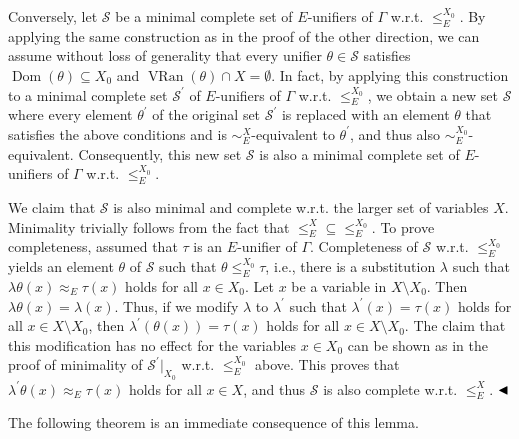 Conversely, let $\mathcal{S}$ be a minimal complete set of $E$-unifiers of $\Gamma$ w.r.t. $\leq_{E}^{X_{0}}$. By applying the same construction as in the proof of the other direction, we can assume without loss of generality that every unifier $\theta\in\mathcal{S}$ satisfies $\operatorname{Dom}(\theta)\subseteq X_{0}$ and $\operatorname{VRan}(\theta)\cap X=\emptyset$. In fact, by applying this construction to a minimal complete set $\mathcal{S}^{\prime}$ of $E$-unifiers of $\Gamma$ w.r.t. $\leq_{E}^{X_{0}}$, we obtain a new set $\mathcal{S}$ where every element $\theta^{\prime}$ of the original set $\mathcal{S}^{\prime}$ is replaced with an element $\theta$ that satisfies the above conditions and is $\sim_{E}^{X}$-equivalent to $\theta^{\prime}$, and thus also $\sim_{E}^{X_{0}}$-equivalent. Consequently, this new set $\mathcal{S}$ is also a minimal complete set of $E$-unifiers of $\Gamma$ w.r.t. $\leq_{E}^{X_{0}}$.\par
 
 
 
We claim that $\mathcal{S}$ is also minimal and complete w.r.t. the larger set of variables $X$. Minimality trivially follows from the fact that ${\leq_{E}^{X}}\subseteq{\leq_{E}^{X_{0}}}$. To prove completeness, assumed that $\tau$ is an $E$-unifier of $\Gamma$. Completeness of $\mathcal{S}$ w.r.t. $\leq_{E}^{X_{0}}$ yields an element $\theta$ of $\mathcal{S}$ such that $\theta\leq_{E}^{X_{0}}\tau$, i.e., there is a substitution $\lambda$ such that $\lambda\theta(x)\approx_{E}\tau(x)$ holds for all $x\in X_{0}$. Let $x$ be a variable in $X\setminus X_{0}$. Then $\lambda\theta(x)=\lambda(x)$. Thus, if we modify $\lambda$ to $\lambda^{\prime}$ such that $\lambda^{\prime}(x)=\tau(x)$ holds for all $x\in X\setminus X_{0}$, then $\lambda^{\prime}(\theta(x))=\tau(x)$ holds for all $x\in X\setminus X_{0}$. The claim that this modification has no effect for the variables $x\in X_{0}$ can be shown as in the proof of minimality of $\mathcal{S}^{\prime}|_{X_{0}}$ w.r.t. $\leq_{E}^{X_{0}}$ above. This proves that $\lambda^{\prime}\theta(x)\approx_{E}\tau(x)$ holds for all $x\in X$, and thus $\mathcal{S}$ is also complete w.r.t. $\leq_{E}^{X}$. $\hfill\blacktriangleleft$\par
 
 
 
The following theorem is an immediate consequence of this lemma.\par
 
